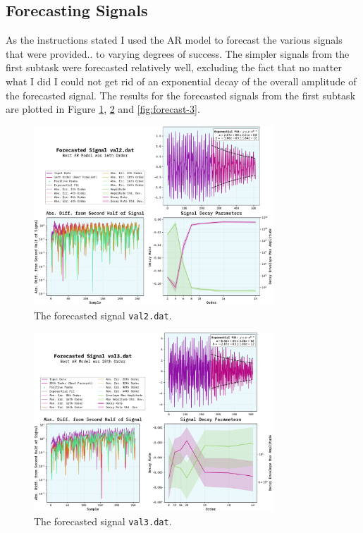 \documentclass[10pt, titlepage, a4paper]{article}
\begin{document}
\subsection{Forecasting Signals}
As the instructions stated I used the AR model to forecast the various signals that were provided.. to varying 
degrees of success. The simpler signals from the first subtask were forecasted relatively well, excluding the fact that 
no matter what I did I could not get rid of an exponential decay of the overall amplitude of the forecasted signal. The results 
for the forecasted signals from the first subtask are plotted in Figure \ref{fig:forecast-1}, \ref{fig:forecast-2} and
\ref{fig:forecast-3}.

\begin{figure}[H]
    \centering
    \includegraphics[width=0.8\textwidth]{../LinForecast/Images/forecast-val2.dat.pdf}
    \caption{The forecasted signal \texttt{val2.dat}.}
    \label{fig:forecast-1}
\end{figure}

\begin{figure}[H]
    \centering
    \includegraphics[width=0.8\textwidth]{../LinForecast/Images/forecast-val3.dat.pdf}
    \caption{The forecasted signal \texttt{val3.dat}.}
    \label{fig:forecast-2}
\end{figure}
\end{document}
